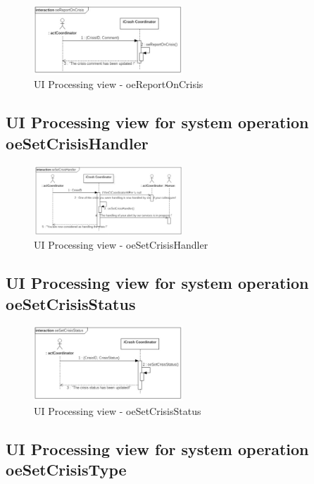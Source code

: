 \begin{figure}[h]
	\centering	
	\captionsetup{justification=centering}
	\includegraphics[width=0.5\textwidth]{./images/ui_oeReportOnCrisis.eps}
	\caption{UI Processing view - oeReportOnCrisis}
\end{figure}


\subsection{UI Processing view for system operation oeSetCrisisHandler}

\begin{figure}[h]
	\centering	
	\captionsetup{justification=centering}
	\includegraphics[width=0.5\textwidth]{./images/ui_oeSetCrisisHandler.eps}
	\caption{UI Processing view - oeSetCrisisHandler}
\end{figure}


\subsection{UI Processing view for system operation oeSetCrisisStatus}

\begin{figure}[h]
	\centering	
	\captionsetup{justification=centering}
	\includegraphics[width=0.5\textwidth]{./images/ui_oeSetCrisisStatus.eps}
	\caption{UI Processing view - oeSetCrisisStatus}
\end{figure}


\subsection{UI Processing view for system operation oeSetCrisisType}

